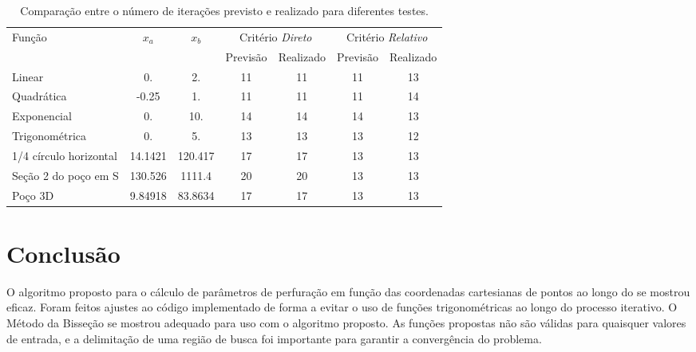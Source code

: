 \documentclass[final,3p,12pt]{elsarticle}
\begin{document}
    \begin{table}[h] 
        \centering
        \caption{Comparação entre o número de iterações previsto e realizado para diferentes testes.}
        \begin{tabular}{ l c c c c c c }
            \multirow{2}{*}{Função} & \multirow{2}{*}{$x_a$} & \multirow{2}{*}{$x_b$} & \multicolumn{2}{c}{Critério \emph{Direto}} & \multicolumn{2}{c}{Critério \emph{Relativo}} \\
            &  &  & Previsão & Realizado & Previsão & Realizado \\
            \hline
            Linear & 0. & 2. & 11 & 11 & 11 & 13 \\
            Quadrática & -0.25 & 1. & 11 & 11 & 11 & 14 \\
            Exponencial & 0. & 10. & 14 & 14 & 14 & 13 \\
            Trigonométrica & 0. & 5. & 13 & 13 & 13 & 12 \\
            1/4 círculo horizontal & 14.1421 & 120.417 & 17 & 17 & 13 & 13 \\
            Seção 2 do poço em S & 130.526 & 1111.4 & 20 & 20 & 13 & 13 \\
            Poço 3D & 9.84918 & 83.8634 & 17 & 17 & 13 & 13 \\
        \end{tabular}
        \label{table:iteracoes}
    \end{table}
        
    \section{Conclusão}
    
    O algoritmo proposto para o cálculo de parâmetros de perfuração em função das coordenadas cartesianas de pontos ao longo do se mostrou eficaz. Foram feitos ajustes ao código implementado de forma a evitar o uso de funções trigonométricas ao longo do processo iterativo.
    O Método da Bisseção se mostrou adequado para uso com o algoritmo proposto. As funções propostas não são válidas para quaisquer valores de entrada, e a delimitação de uma região de busca foi importante para garantir a convergência do problema.

    

\end{document}

